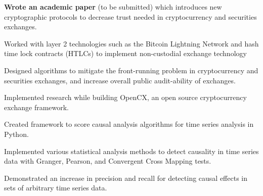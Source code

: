 
\begin{tightemize}
  \item \textbf{Wrote an academic paper} (to be submitted) which introduces new cryptographic protocols to decrease trust needed in cryptocurrency and securities exchanges.
  \item Worked with layer 2 technologies such as the Bitcoin Lightning Network and hash time lock contracts (HTLCs) to implement non-custodial exchange technology
  \item Designed algorithms to mitigate the front-running problem in cryptocurrency and securities exchanges, and increase overall public audit-ability of exchanges.
  \item Implemented research while building OpenCX, an open source cryptocurrency exchange framework.
\end{tightemize}
\subsectionsep

\begin{tightemize}
\item Created framework to score causal analysis algorithms for time series
  analysis in Python.
\item Implemented various statistical analysis methods to detect causality in
  time series data with Granger, Pearson, and Convergent Cross Mapping tests.
\item Demonstrated an increase in precision and recall for detecting causal effects in sets of
  arbitrary time series data.
\end{tightemize}
\subsectionsep

